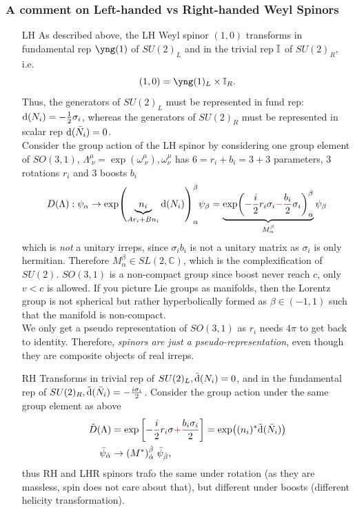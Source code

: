 \subsubsection{A comment on Left-handed vs Right-handed Weyl Spinors}
\label{subsubsec:lhrhSpinors}
\begin{enumerate} 
	\item[LH]
As described above, the LH Weyl spinor $(1,0)$ transforms in fundamental rep $\yng(1)$ of $SU(2)_L$ and in the trivial rep $\mathbb{I}$ of $SU(2)_R$, i.e.
\begin{equation*}
	(1,0)=\yng(1)_L \times \mI_R.
\end{equation*}
Thus, the generators of $SU(2)_L$ must be represented in fund rep: $\mathrm{d}(N_i)=-\frac{1}{2} \sigma_i$, whereas the generators of $SU(2)_R$ must be represented in scalar rep $\mathrm{d}(\bar{ N}_i)=0$. \\
Consider the group action of the LH spinor by considering one group element of $SO(3,1)$, $\Lambda^\mu_{\;\nu}=\exp(\omega^\mu_{\;\nu}), \omega^\mu_\nu$ has $6=r_i+b_i=3+3$ parameters, $3$ rotations $r_i$ and $3$ boosts $b_i$
\begin{equation*}
	D(\Lambda): \psi_\alpha \rightarrow \exp(\underbrace{n_i}_{Ar_i+Bn_i} \mathrm{d}(N_i))^\beta_\alpha \psi_\beta = \underbrace{\exp(-\frac{i}{2} r_i \sigma_i \textcolor{red}{-} \frac{b_i}{2}\sigma_i)^\beta_\alpha}_{M^\beta_\alpha}\psi_\beta
\end{equation*}
which is \emph{not} a unitary irreps, since $\sigma_i b_i$ is not a unitary matrix as $\sigma_i$ is only hermitian. Therefore $M^\beta_\alpha \in SL(2,\mathbb{C})$, which is the complexification of $SU(2)$. $SO(3,1)$ is a non-compact group since boost never reach $c$, only $v<c$ is allowed. If you picture Lie groups as manifolds, then the Lorentz group is not spherical but rather hyperbolically formed as $\beta \in (-1,1)$ such that the manifold is non-compact.\\
We only get a pseudo representation of $SO(3,1)$ as $r_i$ needs $4\pi$ to get back to identity. Therefore, \emph{spinors are just a pseudo-representation}, even though they are composite objects of real irreps.
\item[RH] Transforms in trivial rep of $SU(2)_L, \tilde{\mathrm{d}}(N_i)=0$, and in the fundamental rep of $SU(2)_R, \tilde{\mathrm{d}}( \bar{ N}_i)= - \frac{i\sigma_i}{2}$. Consider the group action under the same group element as above
\begin{align*}
	\tilde{D}(\Lambda)&=\exp\left[-\frac{i}{2} r_i \sigma \textcolor{red}{+} \frac{b_i\sigma_i}{2} \right] = \exp((n_i)^* \tilde{\mathrm{d}}(\bar{ N}_i))\\
	\bar{ \psi}_{\dot{\alpha}} &\rightarrow (M^*)^{\dot{\beta}}_{\dot{\alpha}}   \; \bar{ \psi}_{\dot{\beta}},
\end{align*}
thus RH and LHR spinors trafo the same under rotation (as they are massless, spin does not care about that), but different under boosts (different helicity transformation).
\end{enumerate}
